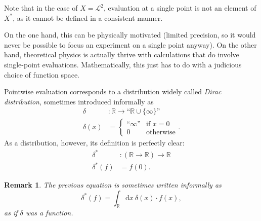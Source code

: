 \documentclass[final,sigplan,review,anonymous]{acmart}\settopmatter{printfolios=true,printccs=false,printacmref=false}
\theoremstyle{acmplain}
\theoremstyle{acmdefinition}
\newtheorem{remark}[theorem]{Remark}
\begin{document}
Note that in the case of $X = \mathcal{L}^2$, evaluation at a single point is not an element of $X^{\ast}$, as it cannot be defined in a consistent manner.

On the one hand, this can be physically motivated (limited precision, so it would never be possible to focus an experiment on a single point anyway).
On the other hand, theoretical physics is actually thrive with calculations that do involve single-point evaluations.
Mathematically, this just has to do with a judicious choice of function space.

Pointwise evaluation corresponds to a distribution widely called \emph{Dirac distribution}, sometimes introduced informally as
\begin{align*}
  \delta &\colon \mathbb{R} \to “\mathbb{R}\cup\{\infty\}”
 \\
  \delta(x) &= \begin{cases} “\infty” & \text{if }x=0
                          \\ 0        & \text{otherwise} \end{cases}.
\end{align*}
As a distribution, however, its definition is perfectly clear:
\begin{align*}
  \delta^\ast &\colon (\mathbb{R} \to \mathbb{R}) \to \mathbb{R}
 \\
  \delta^\ast(f) &= f(0).
\end{align*}
\begin{remark}
The previous equation is sometimes written informally as
\[
  \delta^\ast(f) = \int_\mathbb{R}\!\mathrm{d}x\: \delta(x)\cdot f(x),
\]
as if $\delta$ was a function.
\end{remark}
\end{document}
